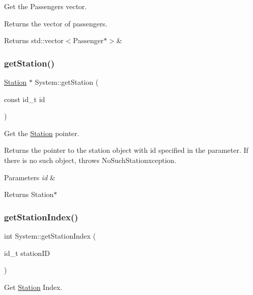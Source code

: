 Get the Passengers vector. 

Returns the vector of passengers.

\begin{DoxyReturn}{Returns}
std\+::vector$<$\+Passenger$\ast$$>$\& 
\end{DoxyReturn}
\mbox{\label{classSystem_aaadc55451a0d43b7ba98ff5377de8e02}} 
\subsubsection{\texorpdfstring{get\+Station()}{getStation()}}
{\footnotesize\ttfamily \mbox{\hyperlink{classStation}{Station}} $\ast$ System\+::get\+Station (\begin{DoxyParamCaption}\item[{const id\+\_\+t}]{id }\end{DoxyParamCaption})}



Get the \mbox{\hyperlink{classStation}{Station}} pointer. 

Returns the pointer to the station object with id specified in the parameter. If there is no such object, throws No\+Such\+Stationxception.


\begin{DoxyParams}{Parameters}
{\em id} & \\
\hline
\end{DoxyParams}
\begin{DoxyReturn}{Returns}
Station$\ast$ 
\end{DoxyReturn}
\mbox{\label{classSystem_a231710db7f31b3fec68f90fd90b292eb}} 
\subsubsection{\texorpdfstring{get\+Station\+Index()}{getStationIndex()}}
{\footnotesize\ttfamily int System\+::get\+Station\+Index (\begin{DoxyParamCaption}\item[{id\+\_\+t}]{station\+ID }\end{DoxyParamCaption})}



Get \mbox{\hyperlink{classStation}{Station}} Index. 

